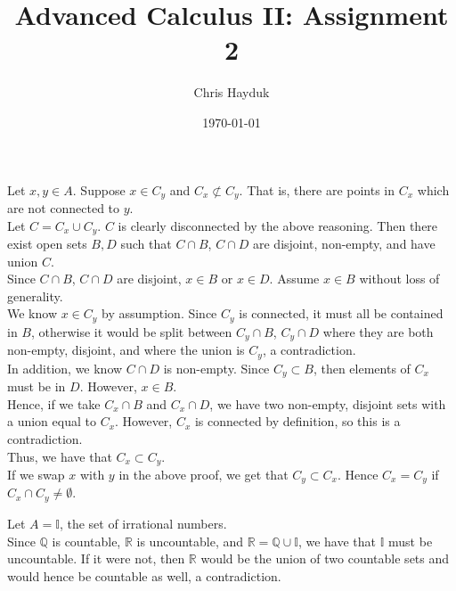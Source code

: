 \documentclass[12pt]{article}
\newenvironment{problem}[2][Problem]{\begin{trivlist}
\item[\hskip \labelsep {\bfseries #1}\hskip \labelsep {\bfseries #2.}]}{\end{trivlist}}
\begin{document}
\title{Advanced Calculus II: Assignment 2}

\author{Chris Hayduk}
\date{\today}

\maketitle

\begin{problem}{1}
\end{problem}

Let $x, y \in A$. Suppose $x \in C_y$ and $C_x \not\subset C_y$. That is, there are points in $C_x$ which are not connected to $y$.\\

Let $C = C_x \cup C_y$. $C$ is clearly disconnected by the above reasoning. Then there exist open sets $B, D$ such that $C \cap B$, $C \cap D$ are disjoint, non-empty, and have union $C$.\\

Since $C \cap B$, $C \cap D$ are disjoint, $x \in B$ or $x \in D$. Assume $x \in B$ without loss of generality.\\

We know $x \in C_y$ by assumption. Since $C_y$ is connected, it must all be contained in $B$, otherwise it would be split between $C_y \cap B$, $C_y \cap D$ where they are both non-empty, disjoint, and where the union is $C_y$, a contradiction.\\

In addition, we know $C \cap D$ is non-empty. Since $C_y \subset B$, then elements of $C_x$ must be in $D$. However, $x \in B$.\\

Hence, if we take $C_x \cap B$ and $C_x \cap D$, we have two non-empty, disjoint sets with a union equal to $C_x$. However, $C_x$ is connected by definition, so this is a contradiction.\\

Thus, we have that $C_x \subset C_y$.\\

If we swap $x$ with $y$ in the above proof, we get that $C_y \subset C_x$. Hence $C_x = C_y$ if $C_x \cap C_y \neq \emptyset$.
\begin{problem}{2}
\end{problem}

Let $A = \mathbb{I}$, the set of irrational numbers.\\

Since $\mathbb{Q}$ is countable, $\mathbb{R}$ is uncountable, and $\mathbb{R} = \mathbb{Q} \cup \mathbb{I}$, we have that $\mathbb{I}$ must be uncountable. If it were not, then $\mathbb{R}$ would be the union of two countable sets and would hence be countable as well, a contradiction.\\
\end{document}
